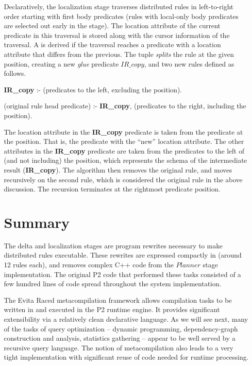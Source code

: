 Declaratively, the localization stage traverses distributed rules in
left-to-right order starting with first body predicates (rules with local-only
body predicates are selected out early in the stage).  The location attribute
of the current predicate in this traversal is stored along with the cursor
information of the traversal.  A  is derived if the traversal
reaches a predicate with a location attribute that differs from the previous.
The  tuple {\em splits} the rule at the given position, creating
a new {\em glue} predicate $IR\_copy$, and two new rules defined as follows.
\begin{CompactEnumerate} 
\item {\bf IR\_copy} :- (predicates to the left, excluding the  position).  
\item (original rule head predicate) :- {\bf IR\_copy}, (predicates to the right, including
  the  position).  
\end{CompactEnumerate} 
The location attribute in the {\bf IR\_copy} predicate is taken from the
predicate at the  position.  That is, the predicate with the
``new'' location attribute.  The other attributes in the {\bf IR\_copy}
predicate are taken from the predicates to the left of (and not including) the
 position, which represents the schema of the intermediate result
({\bf IR\_copy}).  The algorithm then removes the original rule, and moves
recursively on the second rule, which is considered the original rule in the
above discussion.  The recursion terminates at the rightmost predicate
position.

\section{Summary} 
\label{ch:evita:sec:summary} 

The delta and localization stages are program rewrites necessary to make
distributed rules executable.  These rewrites are expressed compactly in
\OVERLOG (around 12 rules each), and removes complex C++ code from the
$Planner$ stage implementation.  The original P2 code that performed these
tasks consisted of a few hundred lines of code spread throughout the
system implementation.

The Evita Raced metacompilation framework allows \OVERLOG compilation tasks to
be written in \OVERLOG and executed in the P2 runtime engine.  It provides
significant extensibility via a relatively clean declarative language.  As we
will see next, many of the tasks of query optimization -- dynamic programming,
dependency-graph construction and analysis, statistics gathering -- appear to
be well served by a recursive query language.  The notion of metacompilation
also leads to a very tight implementation with significant reuse of code needed
for runtime processing.



